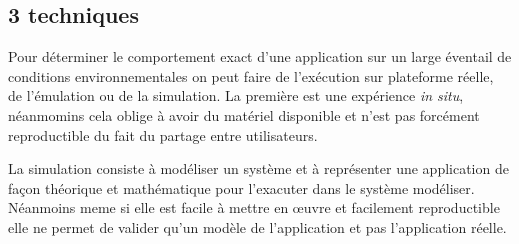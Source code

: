 \documentclass{article}
\begin{document}
\subsection{3 techniques}
Pour déterminer le comportement exact d'une application sur un large éventail de
conditions environnementales on peut faire de l'exécution sur plateforme réelle,
de l'émulation ou de la simulation. La première est une expérience \textit{in
  situ}, néanmomins cela oblige à avoir du matériel disponible et n'est pas
forcément reproductible du fait du partage entre utilisateurs.

La simulation consiste à modéliser un système et à représenter une application
de façon théorique et mathématique pour l'exacuter dans le système
modéliser. Néanmoins meme si elle est facile à mettre en \oe uvre et facilement
reproductible elle ne permet de valider qu'un modèle de l'application et pas
l'application réelle.
\end{document}
